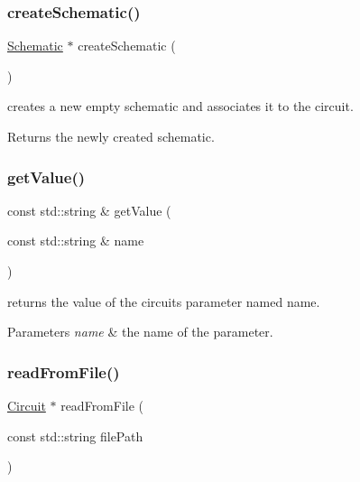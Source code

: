 \subsubsection{\texorpdfstring{create\+Schematic()}{createSchematic()}}
{\footnotesize\ttfamily \mbox{\hyperlink{class_open_chams_1_1_schematic}{Schematic}} $\ast$ create\+Schematic (\begin{DoxyParamCaption}{ }\end{DoxyParamCaption})}



creates a new empty schematic and associates it to the circuit. 

\begin{DoxyReturn}{Returns}
the newly created schematic. 
\end{DoxyReturn}
\mbox{\label{class_open_chams_1_1_circuit_a6650bf10e394fe2d6fa1d50e247da296}} 
\subsubsection{\texorpdfstring{get\+Value()}{getValue()}}
{\footnotesize\ttfamily const std\+::string \& get\+Value (\begin{DoxyParamCaption}\item[{const std\+::string \&}]{name }\end{DoxyParamCaption})\hspace{0.3cm}{\ttfamily [inline]}}



returns the value of the circuit\textquotesingle{}s parameter named {\ttfamily name}. 


\begin{DoxyParams}{Parameters}
{\em name} & the name of the parameter. \\
\hline
\end{DoxyParams}
\mbox{\label{class_open_chams_1_1_circuit_ad0aa3183bdea59e62f69c295026b7fe7}} 
\subsubsection{\texorpdfstring{read\+From\+File()}{readFromFile()}}
{\footnotesize\ttfamily \mbox{\hyperlink{class_open_chams_1_1_circuit}{Circuit}} $\ast$ read\+From\+File (\begin{DoxyParamCaption}\item[{const std\+::string}]{file\+Path }\end{DoxyParamCaption})\hspace{0.3cm}{\ttfamily [static]}}



